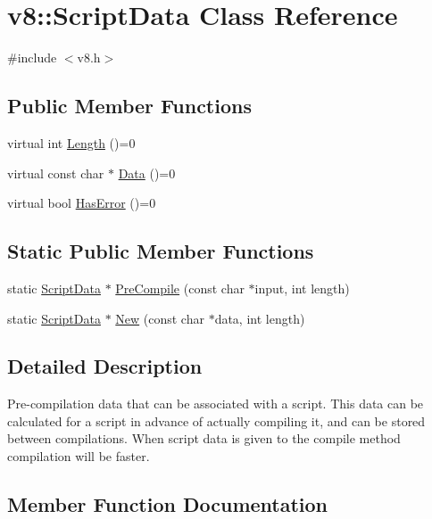 \hypertarget{classv8_1_1_script_data}{}\section{v8\+:\+:Script\+Data Class Reference}
\label{classv8_1_1_script_data}


{\ttfamily \#include $<$v8.\+h$>$}

\subsection*{Public Member Functions}
\begin{DoxyCompactItemize}
\item 
virtual int \hyperlink{classv8_1_1_script_data_a6aa1007dfe6b09a5e59443bb1afff0b9}{Length} ()=0
\item 
virtual const char $\ast$ \hyperlink{classv8_1_1_script_data_aae01a4e977988fa8338d11d87b572cfa}{Data} ()=0
\item 
virtual bool \hyperlink{classv8_1_1_script_data_ab5cea77b299b7dd73b7024fb114fd7e4}{Has\+Error} ()=0
\end{DoxyCompactItemize}
\subsection*{Static Public Member Functions}
\begin{DoxyCompactItemize}
\item 
static \hyperlink{classv8_1_1_script_data}{Script\+Data} $\ast$ \hyperlink{classv8_1_1_script_data_a4bb3cdd4abbde99a000a0c25b6357520}{Pre\+Compile} (const char $\ast$input, int length)
\item 
static \hyperlink{classv8_1_1_script_data}{Script\+Data} $\ast$ \hyperlink{classv8_1_1_script_data_a642fc06a9615387f9ac80f264758cc70}{New} (const char $\ast$data, int length)
\end{DoxyCompactItemize}


\subsection{Detailed Description}
Pre-\/compilation data that can be associated with a script. This data can be calculated for a script in advance of actually compiling it, and can be stored between compilations. When script data is given to the compile method compilation will be faster. 

\subsection{Member Function Documentation}
\hypertarget{classv8_1_1_script_data_aae01a4e977988fa8338d11d87b572cfa}{}
